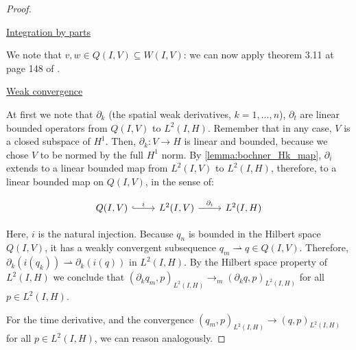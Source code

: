 \documentclass[english,a4paper,10pt,oneside]{scrbook}	%
\theoremstyle{break}
\newenvironment{mproof}[1][\proofname]{%
  \begin{proof}[#1]$ $\par\nobreak\ignorespaces
}{%
  \end{proof}
}
\renewcommand*{\proofname}{Proof}
\theoremstyle{remark}
\newcommand{\ind}[1]{\{\text{ #1 }\}}
\newcommand{\weakc}{\rightharpoonup}
\begin{document}
\begin{appendices}
\begin{mproof}
%
%
%
%
%
%
%
\underline{Integration by parts}

We note that $v,w \in Q(I,V)\subseteq W(I,V)$: we can now apply theorem 3.11 at page 148 of \cite{trol}.

\underline{Weak convergence}

At first we note that $\partial_k$ (the spatial weak derivatives, $k=1,...,n$), $\partial_t$ are linear bounded operators from $Q(I,V)$ to $L^2(I,H)$.
Remember that in any case, $V$ is a closed subspace of $H^1$. Then, $\partial_k : V\rightarrow H$ is linear and bounded, because we chose $V$ to be normed by the full $H^1$ norm.
By \cref{lemma:bochner_Hk_map}, $\partial_i$ extends to a linear bounded map from $L^2(I,V)$ to $L^2(I,H)$, therefore, to a linear bounded map on $Q(I,V)$, in the sense of:

\[\begin{tikzcd}
	{Q(I,V)} & {L^2(I,V)} & {L^2(I,H)}
	\arrow["i", hook, from=1-1, to=1-2]
	\arrow["{\partial_i}", from=1-2, to=1-3]
\end{tikzcd}\]

Here, $i$ is the natural injection. Because $q_n$ is bounded in the Hilbert space $Q(I,V)$, it has a weakly convergent subsequence $q_m\weakc q \in Q(I,V)$. Therefore, $\partial_k (i(q_k))\weakc \partial_k (i(q))$ in $L^2(I,H)$. By the Hilbert space property of $L^2(I,H)$ we conclude that $(\partial_k q_m,p)_{L^2(I,H)}\rightarrow_m (\partial_k q,p)_{L^2(I,H)}$ for all $p \in L^2(I,H)$.

For the time derivative, and the convergence $(q_m,p)_{L^2(I,H)}\rightarrow (q,p)_{L^2(I,H)}$ for all $p \in L^2(I,H)$, we can reason analogously.
\end{mproof}


\end{appendices}
\end{document}
